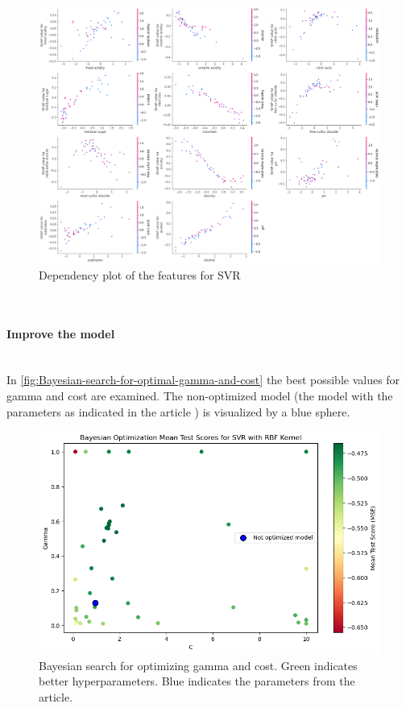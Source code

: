 \documentclass{article}
\newcommand{\subsubsubsection}[1]{%
  \paragraph{#1}\mbox{}\\}
\begin{document}
\begin{figure}
    \centering
    \includegraphics[width=\linewidth]{figures/shap-dependency-svr.png}
    \caption{Dependency plot of the features for SVR}
    \label{fig:dependency-plot-svr}
\end{figure}

\subsubsubsection{Improve the model}

In \autoref{fig:Bayesian-search-for-optimal-gamma-and-cost} the best possible values for gamma and cost are examined. The non-optimized model (the model with the parameters as indicated in the article \cite{dahal2021prediction} ) is visualized by a blue sphere.
\begin{figure}
    \centering
    \includegraphics[width=\linewidth]{figures/bayesian_optimization.png}
    \caption{Bayesian search for optimizing gamma and cost. Green indicates better hyperparameters. Blue indicates the parameters from the article.}
    \label{fig:Bayesian-search-for-optimal-gamma-and-cost}
\end{figure}
\end{document}
